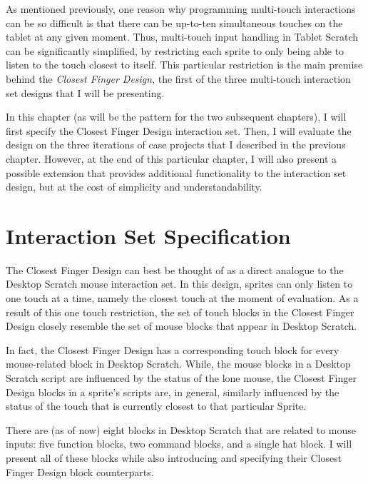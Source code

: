 As mentioned previously, one reason why programming multi-touch interactions can be so difficult is that there can be up-to-ten simultaneous touches on the tablet at any given moment. Thus, multi-touch input handling in Tablet Scratch can be significantly simplified, by restricting each sprite to only being able to listen to the touch closest to itself. This particular restriction is the main premise behind the \emph{Closest Finger Design}, the first of the three multi-touch interaction set designs that I will be presenting.

In this chapter (as will be the pattern for the two subsequent chapters), I will first specify the Closest Finger Design interaction set. Then, I will evaluate the design on the three iterations of case projects that I described in the previous chapter. However, at the end of this particular chapter, I will also present a possible extension that provides additional functionality to the interaction set design, but at the cost of simplicity and understandability.

\section{Interaction Set Specification}

The Closest Finger Design can best be thought of as a direct analogue to the Desktop Scratch mouse interaction set. In this design, sprites can only listen to one touch at a time, namely the closest touch at the moment of evaluation. As a result of this one touch restriction, the set of touch blocks in the Closest Finger Design closely resemble the set of mouse blocks that appear in Desktop Scratch.

In fact, the Closest Finger Design has a corresponding touch block for every mouse-related block in Desktop Scratch. While, the mouse blocks in a Desktop Scratch script are influenced by the status of the lone mouse,  the Closest Finger Design blocks in a sprite's scripts are, in general, similarly influenced by the status of the touch that is currently closest to that particular Sprite. 

There are (as of now) eight blocks in Desktop Scratch that are related to mouse inputs: five function blocks, two command blocks, and a single hat block. I will  present all of these blocks while also introducing and specifying their Closest Finger Design block counterparts.

